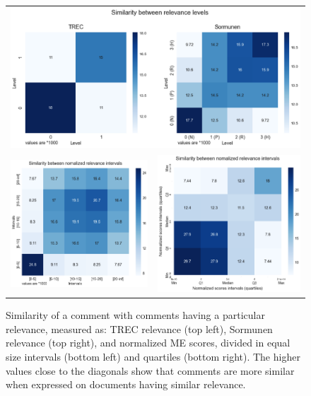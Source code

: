 \begin{figure}[tp]
  \centering
  \begin{tabular}{cc}
  \multicolumn{2}{c}{\includegraphics[width=.9\linewidth]{figs/SimilarityTRECSormunen.png}}\\
  \includegraphics[width=.42\linewidth]{figs/SimilarityIntervals.png}&
  \includegraphics[width=.42\linewidth]{figs/SimilarityQuantiles.png}
  \end{tabular}
  \caption{Similarity of a comment with comments having a particular
    relevance, measured as: TREC relevance (top left), Sormunen
    relevance (top right), and normalized ME scores, divided in equal
    size intervals (bottom left) and quartiles (bottom right). The
    higher values close to the diagonals show that comments are more
    similar when expressed on documents having similar relevance.
  \label{fig:simRelevanceLevels}}
\end{figure}



